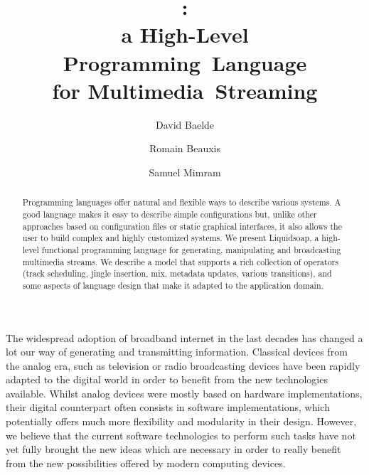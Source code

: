 \documentclass{llncs}
\title{\liquidsoap{}: \\
  a High-Level Programming~Language \\
  for Multimedia~Streaming}
\author{David Baelde\inst{1} \and Romain Beauxis\inst{2} \and Samuel Mimram\inst{3}}
\institute{
  University of Minnesota, USA
  \and
  Tulane University, USA
  \and
  CEA LIST -- LMeASI, France
}
\newcommand{\liquidsoap}{Liquidsoap}
\newcommand{\eg}{{e.g.,}}
\begin{document}
\maketitle

\begin{abstract}
Programming languages offer natural and flexible ways to describe various
systems. A good language makes it easy to describe simple configurations but,
unlike other approaches based on configuration files or static graphical
interfaces, it also allows the user to build complex and highly customized systems.
We present \liquidsoap, a high-level functional programming
language for generating, manipulating and broadcasting multimedia streams. We
describe a model that supports a rich collection of operators (track scheduling,
jingle insertion, mix, metadata updates, various transitions), and some aspects
of language design that make it adapted to the application domain.
\end{abstract}

The widespread adoption of broadband internet in the last decades has
changed a lot our way of generating and transmitting information. Classical
devices from the analog era, such as television or radio broadcasting devices
have been rapidly adapted to the digital world in order to benefit from the new
technologies available. Whilst analog devices were mostly based on hardware
implementations, their digital counterpart often consists in software
implementations,
which potentially offers much more flexibility and modularity in their design.
However, we believe that the current software technologies to perform such tasks
have not yet fully brought the new ideas which are necessary in order to really
benefit from the new possibilities offered by modern computing devices.
\end{document}
